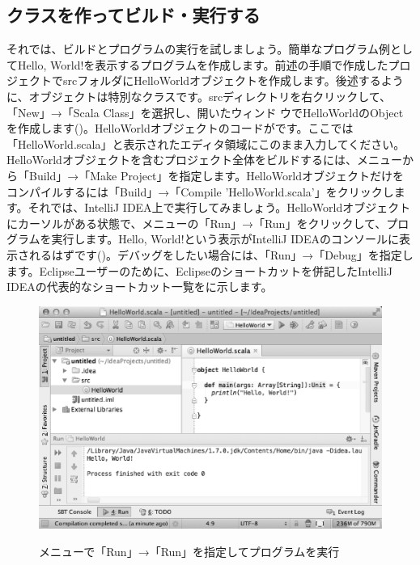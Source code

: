 \subsection{クラスを作ってビルド・実行する}
それでは、ビルドとプログラムの実行を試しましょう。簡単なプログラム例としてHello, World!を表示するプログラムを作成します。前述の手順で作成したプロジェクトでsrcフォルダにHelloWorldオブジェクトを作成します。後述するように、オブジェクトは特別なクラスです。srcディレクトリを右クリックして、「New」→「Scala Class」を選択し、開いたウィンド ウでHelloWorldのObjectを作成します()。HelloWorldオブジェクトのコードがです。ここでは「HelloWorld.scala」と表示されたエディタ領域にこのまま入力してください。HelloWorldオブジェクトを含むプロジェクト全体をビルドするには、メニューから「Build」→「Make Project」を指定します。HelloWorldオブジェクトだけをコンパイルするには「Build」→「Compile 'HelloWorld.scala'」をクリックします。それでは、IntelliJ IDEA上で実行してみましょう。HelloWorldオブジェクトにカーソルがある状態で、メニューの「Run」→「Run」をクリックして、プログラムを実行します。Hello, World!という表示がIntelliJ IDEAのコンソールに表示されるはずです()。デバッグをしたい場合には、「Run」→「Debug」を指定します。Eclipseユーザーのために、Eclipseのショートカットを併記したIntelliJ IDEAの代表的なショートカット一覧をに示します。

\begin{figure}[h]
  \centering
  \caption{メニューで「Run」→「Run」を指定してプログラムを実行}
  \includegraphics[scale=0.4]{hn-scala-hwg/img/intellij.eps}
  \label{fig:intellij}
\end{figure}

